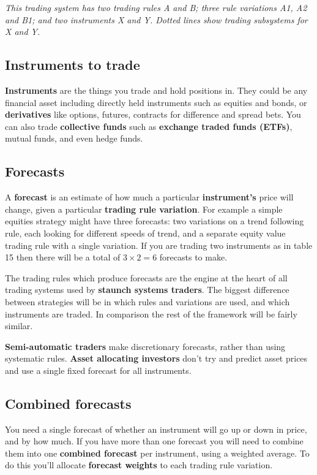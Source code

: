\noindent\textit{This trading system has two trading rules A and B; three rule variations A1, A2 and B1; and two instruments X and Y. Dotted lines show trading subsystems for X and Y.}

\subsection*{Instruments to trade}

\textbf{Instruments} are the things you trade and hold positions in. They could be any financial asset including directly held instruments such as equities and bonds, or \textbf{derivatives} like options, futures, contracts for difference and spread bets. You can also trade \textbf{collective funds} such as \textbf{exchange traded funds (ETFs)}, mutual funds, and even hedge funds.

\subsection*{Forecasts}

A \textbf{forecast} is an estimate of how much a particular \textbf{instrument's} price will change, given a particular \textbf{trading rule variation}. For example a simple equities strategy might have three forecasts: two variations on a trend following rule, each looking for different speeds of trend, and a separate equity value trading rule with a single variation. If you are trading two instruments as in table 15 then there will be a total of \(3 \times 2 = 6\) forecasts to make. 

The trading rules which produce forecasts are the engine at the heart of all trading systems used by \textbf{staunch systems traders}. The biggest difference between strategies will be in which rules and variations are used, and which instruments are traded. In comparison the rest of the framework will be fairly similar.

\textbf{Semi-automatic traders} make discretionary forecasts, rather than using systematic rules. \textbf{Asset allocating investors} don't try and predict asset prices and use a single fixed forecast for all instruments.

\subsection*{Combined forecasts}

You need a single forecast of whether an instrument will go up or down in price, and by how much. If you have more than one forecast you will need to combine them into one \textbf{combined forecast} per instrument, using a weighted average. To do this you'll allocate \textbf{forecast weights} to each trading rule variation.

